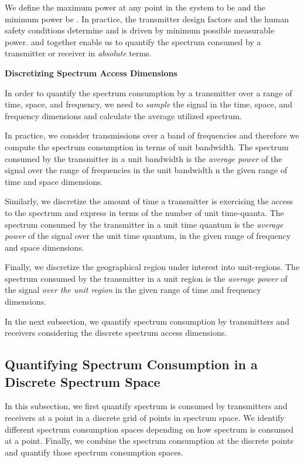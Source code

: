\documentclass[journal,12pt,draftclsnofoot,onecolumn]{IEEEtran}
\begin{document}
We define the maximum power at any point in the system to be  and the minimum power be . In practice, the transmitter design factors and the human safety conditions determine  and  is driven by minimum possible measurable power.  and  together enable us to quantify the spectrum consumed by a transmitter or receiver in \textit{absolute} terms.

\noindent
\textbf{Discretizing Spectrum Access Dimensions}

In order to quantify the spectrum consumption by a transmitter over a range of time, space, and frequency, we need to \textit{sample} the signal in the time, space, and frequency dimensions and calculate the average utilized spectrum.

In practice, we consider transmissions over a band of frequencies and therefore we compute the spectrum consumption in terms of unit bandwidth. The spectrum consumed by the transmitter in a unit bandwidth is the \textit{average power} of the signal over the range of frequencies in the unit bandwidth n the given range of time and space dimensions.

Similarly, we discretize the amount of time a transmitter is exercising the access to the spectrum and express in terms of the number of unit time-quanta.
The spectrum consumed by the transmitter in a unit time quantum is the \textit{average power} of the signal over the unit time quantum, in the given range of frequency and space dimensions. 

Finally, we discretize the geographical region under interest into unit-regions. The spectrum consumed by the transmitter in a unit region is the \textit{average power }of the signal \textit{over the unit region} in the given range of time and frequency dimensions.

In the next subsection, we quantify spectrum consumption by transmitters and receivers considering the discrete spectrum access dimensions. 
\subsection{Quantifying Spectrum Consumption in a Discrete Spectrum Space}

In this subsection, we first quantify spectrum is consumed by transmitters and receivers at a point in a discrete grid of points in spectrum space. We identify different spectrum consumption spaces depending on how spectrum is consumed at a point. Finally, we combine the spectrum consumption at the discrete points and quantify those spectrum consumption spaces.
\end{document}
